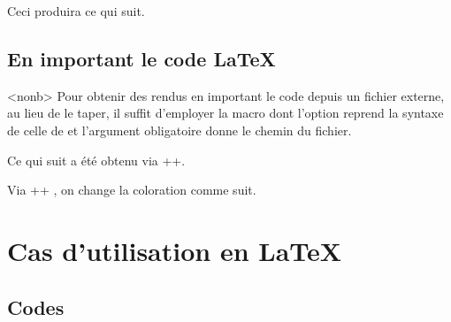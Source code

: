 \documentclass[12pt, a4paper]{article}
\begin{document}


\begin{bdocexa}
    \leavevmode


    Ceci produira ce qui suit.

    \medskip

    
\end{bdocexa}




\subsection{En important le code \LaTeX}

\begin{bdocexa}<nonb>
    Pour obtenir des rendus en important le code depuis un fichier externe, au lieu de le taper, il suffit d'employer la macro  dont l'option reprend la syntaxe de celle de  et l'argument obligatoire donne le chemin du fichier.

    \medskip

    Ce qui suit a été obtenu via \bdocinlatex++.

    \medskip


    \medskip

    Via \bdocinlatex++ , on change la coloration comme suit.

    \medskip

\end{bdocexa}


\section{Cas d'utilisation en \LaTeX}

\subsection{Codes }
\end{document}
